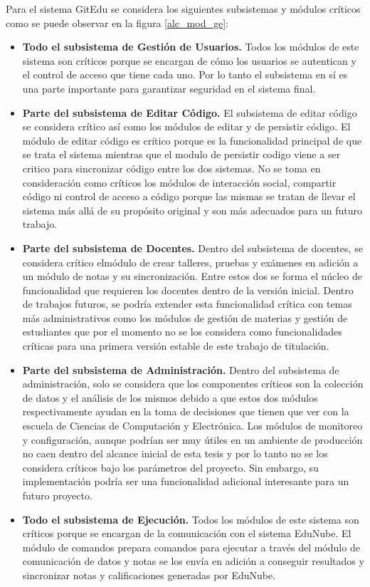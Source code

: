 Para el sistema GitEdu se considera los siguientes subsistemas y módulos críticos como se puede observar en la figura \ref{alc_mod_ge}:
\begin{itemize}
	\item \textbf{Todo el subsistema de Gestión de Usuarios.} Todos los módulos de este sistema son críticos porque se encargan de cómo los usuarios se autentican y el control de acceso que tiene cada uno. Por lo tanto el subsistema en sí es una parte importante para garantizar seguridad en el sistema final.
    \item \textbf{Parte del subsistema de Editar Código.} El subsistema de editar código se considera crítico así como los módulos de editar y de persistir código. El módulo de editar código es crítico porque es la funcionalidad principal de que se trata el sistema mientras que el modulo de persistir codigo viene a ser critico para sincronizar código entre los dos sistemas. No se toma en consideración como críticos los módulos de interacción social, compartir código ni control de acceso a código porque las mismas se tratan de llevar el sistema más allá de su propósito original y son más adecuados para un futuro trabajo.
    \item \textbf{Parte del subsistema de Docentes.} Dentro del subsistema de docentes, se considera crítico elmódulo de crear talleres, pruebas y exámenes en adición a un módulo de notas y su sincronización. Entre estos dos se forma el núcleo de funcionalidad que requieren los docentes dentro de la versión inicial. Dentro de trabajos futuros, se podría extender esta funcionalidad crítica con temas más administrativos como los módulos de gestión de materias y gestión de estudiantes que por el momento no se los considera como funcionalidades críticas para una primera versión estable de este trabajo de titulación.
    \item \textbf{Parte del subsistema de Administración.} Dentro del subsistema de administración, solo se considera que los componentes críticos son la colección de datos y el análisis de los mismos debido a que estos dos módulos respectivamente ayudan en la toma de decisiones que tienen que ver con la escuela de Ciencias de Computación y Electrónica. Los módulos de monitoreo y configuración, aunque podrían ser muy útiles en un ambiente de producción no caen dentro del alcance inicial de esta tesis y por lo tanto no se los considera críticos bajo los parámetros del proyecto. Sin embargo, su implementación podría ser una funcionalidad adicional interesante para un futuro proyecto.
    \item \textbf{Todo el subsistema de Ejecución.} Todos los módulos de este sistema son críticos porque se encargan de la comunicación con el sistema EduNube. El módulo de comandos prepara comandos para ejecutar a través del módulo de comunicación de datos y notas se los envía en adición a conseguir resultados y sincronizar notas y calificaciones generadas por EduNube.
\end{itemize}

